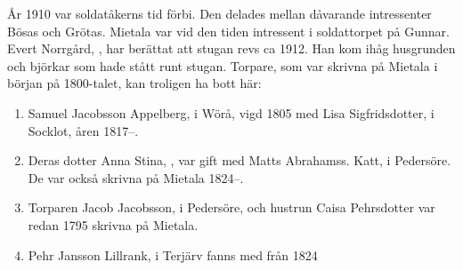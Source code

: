 År 1910 var soldatåkerns tid förbi. Den delades mellan dåvarande intressenter Bösas och Grötas. Mietala var vid den tiden intressent i soldattorpet på Gunnar. Evert Norrgård, , har berättat att stugan revs ca 1912. Han kom ihåg husgrunden och björkar som hade stått runt stugan. Torpare, som var skrivna på Mietala i början på 1800-talet, kan troligen ha bott här:
\begin{enumerate}
  \item Samuel Jacobsson Appelberg,  i Wörå, vigd 1805 med Lisa Sigfridsdotter,  i Socklot, åren 1817--.
  \item Deras dotter Anna Stina, , var gift med Matts Abrahamss. Katt,  i Pedersöre. De var också skrivna på Mietala 1824--.
  \item Torparen Jacob Jacobsson,  i Pedersöre, och hustrun Caisa Pehrsdotter var redan
  1795 skrivna på Mietala.
  \item Pehr Jansson Lillrank,  i Terjärv fanns med från 1824
\end{enumerate}


